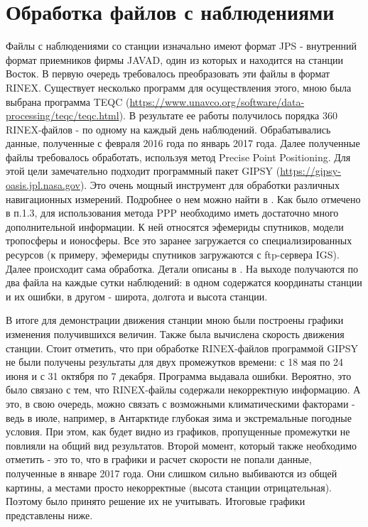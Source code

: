 \documentclass[a4paper,12pt]{report}
\begin{document}
\section{Обработка файлов с наблюдениями}
Файлы с наблюдениями со станции изначально имеют формат JPS - внутренний формат приемников фирмы JAVAD, один из которых и находится 
на станции Восток. В первую очередь требовалось преобразовать эти файлы в формат RINEX. Существует несколько программ для осуществления 
этого, мною была выбрана программа TEQC (\url{https://www.unavco.org/software/data-processing/teqc/teqc.html}). В результате ее работы 
получилось порядка 360 RINEX-файлов - по одному на каждый день наблюдений. Обрабатывались данные, полученные с февраля 2016 года по 
январь 2017 года. Далее полученные файлы требовалось обработать, используя метод Precise Point Positioning. Для этой цели замечательно 
подходит программный пакет GIPSY (\url{https://gipsy-oasis.jpl.nasa.gov}). Это очень мощный инструмент для обработки различных 
навигационных измерений. Подробнее о нем можно найти в \cite{gipsy_ov}. Как было отмечено в п.1.3, для использования 
метода PPP необходимо иметь достаточно много дополнительной информации. К ней относятся эфемериды спутников, модели тропосферы и 
ионосферы. Все это заранее загружается со специализированных ресурсов (к примеру, эфемериды спутников загружаются с ftp-сервера IGS).
Далее происходит сама обработка. Детали описаны в \cite{gipsy_ppp}. На выходе получаются по два файла на каждые сутки наблюдений: 
в одном содержатся координаты станции и их ошибки, в другом - широта, долгота и высота станции. 
\par В итоге для демонстрации движения станции мною были построены графики изменения получившихся величин. Также была вычислена 
скорость движения станции. Стоит отметить, что при обработке RINEX-файлов программой GIPSY не были получены результаты для двух 
промежутков времени: с 18 мая по 24 июня и с 31 октября по 7 декабря. Программа выдавала ошибки. Вероятно, это было связано с 
тем, что RINEX-файлы содержали некорректную информацию. А это, в свою очередь, можно связать с возможными климатическими факторами - 
ведь в июле, например, в Антарктиде глубокая зима и экстремальные погодные условия. При этом, как будет видно из графиков, пропущенные 
промежутки не повлияли на общий вид результатов. Второй момент, который также необходимо отметить - это то, что в графики и 
расчет скорости не попали данные, полученные в январе 2017 года. Они слишком сильно выбиваются из общей картины, а местами просто 
некорректные (высота станции отрицательная). Поэтому было принято решение их не учитывать. Итоговые графики представлены ниже.
\end{document}
